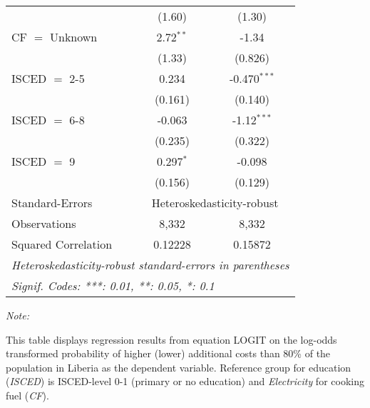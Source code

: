 \begin{table}[htbp!]
\begin{adjustbox}{width = 1\textwidth, max height = 0.95\textheight, center}
\begin{threeparttable}[b]
\begin{tabular}{lcc}
                                 & (1.60)        & (1.30)\\   
            CF $=$ Unknown       & 2.72$^{**}$   & -1.34\\   
                                 & (1.33)        & (0.826)\\   
            ISCED $=$ 2-5        & 0.234         & -0.470$^{***}$\\   
                                 & (0.161)       & (0.140)\\   
            ISCED $=$ 6-8        & -0.063        & -1.12$^{***}$\\   
                                 & (0.235)       & (0.322)\\   
            ISCED $=$ 9          & 0.297$^{*}$   & -0.098\\   
                                 & (0.156)       & (0.129)\\   
            \midrule 
            Standard-Errors & \multicolumn{2}{c}{Heteroskedasticity-robust} \\ 
            Observations         & 8,332         & 8,332\\  
            Squared Correlation  & 0.12228       & 0.15872\\  
            \midrule \midrule
            \multicolumn{3}{l}{\emph{Heteroskedasticity-robust standard-errors in parentheses}}\\
            \multicolumn{3}{l}{\emph{Signif. Codes: ***: 0.01, **: 0.05, *: 0.1}}\\
         \end{tabular}
         
         \begin{tablenotes}\item \medskip \textit{Note:}
            \item This table displays regression results from equation LOGIT on the log-odds transformed probability of higher (lower) additional costs than 80\% of the population in Liberia as the dependent variable. Reference group for education (\textit{ISCED}) is ISCED-level 0-1 (primary or no education) and \textit{Electricity} for cooking fuel (\textit{CF}).
         \end{tablenotes}
      \end{threeparttable}
   \end{adjustbox}
\end{table}


